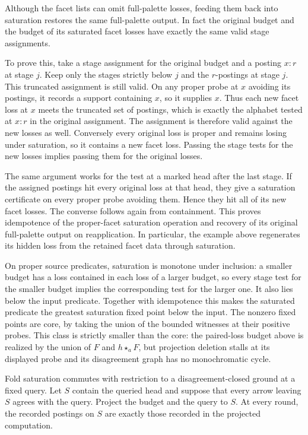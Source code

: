 Although the facet lists can omit full-palette
losses, feeding them back into saturation restores
the same full-palette output. In fact the original
budget and the budget of its saturated facet
losses have exactly the same valid stage
assignments.

To prove this, take a stage assignment for the
original budget and a posting $x:r$ at stage $j$.
Keep only the stages strictly below $j$ and the
$r$-postings at stage $j$. This truncated assignment
is still valid. On any proper probe at $x$
avoiding its postings, it records a support
containing $x$, so it supplies $x$. Thus each
new facet loss at $x$ meets the truncated set
of postings, which is exactly the alphabet
tested at $x:r$ in the original assignment.
The assignment is therefore valid against the
new losses as well. Conversely every original
loss is proper and remains losing under
saturation, so it contains a new facet loss.
Passing the stage tests for the new losses
implies passing them for the original losses.

The same argument works for the test at a marked
head after the last stage. If the assigned
postings hit every original loss at that head,
they give a saturation certificate on every
proper probe avoiding them. Hence they hit all
of its new facet losses. The converse follows
again from containment. This proves idempotence
of the proper-facet saturation operation and
recovery of its original full-palette output
on reapplication. In particular, the example
above regenerates its hidden loss from the
retained facet data through saturation.

On proper source predicates, saturation is
monotone under inclusion: a smaller budget
has a loss contained in each loss of a larger
budget, so every stage test for the smaller
budget implies the corresponding test for
the larger one. It also lies below the input
predicate. Together with idempotence this
makes the saturated predicate the greatest
saturation fixed point below the input.
The nonzero fixed points are core, by taking
the union of the bounded witnesses at their
positive probes. This class is strictly
smaller than the core: the paired-loss budget
above is realized by the union of $F$ and
$h\star_a F$, but projection deletion stalls
at its displayed probe and its disagreement
graph has no monochromatic cycle.

Fold saturation commutes with restriction to a
disagreement-closed ground at a fixed query. Let
$S$ contain the queried head and suppose that every
arrow leaving $S$ agrees with the query. Project
the budget and the query to $S$. At every round,
the recorded postings on $S$ are exactly those
recorded in the projected computation.


